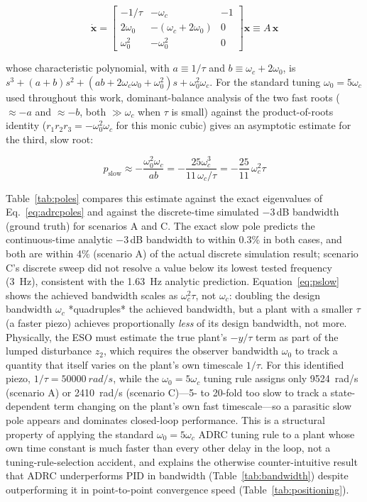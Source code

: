 \documentclass[fleqn,10pt]{wlscirep}
\begin{document}
\begin{equation}
\dot{\mathbf{x}} = \begin{bmatrix} -1/\tau & -\omega_c & -1 \\ 2\omega_0 & -(\omega_c+2\omega_0) & 0 \\ \omega_0^2 & -\omega_0^2 & 0 \end{bmatrix}\mathbf{x} \equiv A\,\mathbf{x}
\label{eq:adrcpoles}
\end{equation}

whose characteristic polynomial, with $a \equiv 1/\tau$ and $b \equiv \omega_c + 2\omega_0$, is $s^3 + (a+b)s^2 + (ab+2\omega_c\omega_0+\omega_0^2)s + \omega_0^2\omega_c$. For the standard tuning $\omega_0 = 5\omega_c$ used throughout this work, dominant-balance analysis of the two fast roots ($\approx -a$ and $\approx -b$, both $\gg \omega_c$ when $\tau$ is small) against the product-of-roots identity ($r_1 r_2 r_3 = -\omega_0^2\omega_c$ for this monic cubic) gives an asymptotic estimate for the third, slow root:

\begin{equation}
p_\text{slow} \approx -\frac{\omega_0^2\omega_c}{ab} = -\frac{25\omega_c^3}{11\,\omega_c/\tau} = -\frac{25}{11}\,\omega_c^2\tau
\label{eq:pslow}
\end{equation}

Table~\ref{tab:poles} compares this estimate against the exact eigenvalues of Eq.~\ref{eq:adrcpoles} and against the discrete-time simulated $-3$\,dB bandwidth (ground truth) for scenarios A and C. The exact slow pole predicts the continuous-time analytic $-3$\,dB bandwidth to within 0.3\% in both cases, and both are within 4\% (scenario A) of the actual discrete simulation result; scenario C's discrete sweep did not resolve a value below its lowest tested frequency (\SI{3}{Hz}), consistent with the \SI{1.63}{Hz} analytic prediction. Equation~\ref{eq:pslow} shows the achieved bandwidth scales as $\omega_c^2\tau$, not $\omega_c$: doubling the design bandwidth $\omega_c$ *quadruples* the achieved bandwidth, but a plant with a smaller $\tau$ (a faster piezo) achieves proportionally \emph{less} of its design bandwidth, not more. Physically, the ESO must estimate the true plant's $-y/\tau$ term as part of the lumped disturbance $z_2$, which requires the observer bandwidth $\omega_0$ to track a quantity that itself varies on the plant's own timescale $1/\tau$. For this identified piezo, $1/\tau = \SI{50000}{rad/s}$, while the $\omega_0 = 5\omega_c$ tuning rule assigns only \SI{9524}{rad/s} (scenario A) or \SI{2410}{rad/s} (scenario C)---5- to 20-fold too slow to track a state-dependent term changing on the plant's own fast timescale---so a parasitic slow pole appears and dominates closed-loop performance. This is a structural property of applying the standard $\omega_0=5\omega_c$ ADRC tuning rule to a plant whose own time constant is much faster than every other delay in the loop, not a tuning-rule-selection accident, and explains the otherwise counter-intuitive result that ADRC underperforms PID in bandwidth (Table~\ref{tab:bandwidth}) despite outperforming it in point-to-point convergence speed (Table~\ref{tab:positioning}).
\end{document}
